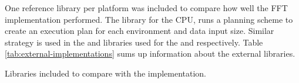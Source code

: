 One reference library per platform was included to compare how well the FFT implementation performed. The \emph{\FFTW} library for the \gls{CPU}, runs a planning scheme to create an execution plan for each environment and data input size. Similar strategy is used in the {\CUFFT} and {\CLFFT} libraries used for the {\NVCARD} and {\AMDCARD} respectively. Table \ref{tab:external-implementations} sums up information about the external libraries.

\begin{table}
	\centering
	
	\caption{Libraries included to compare with the implementation.}
	\label{tab:external-implementations}
\end{table}